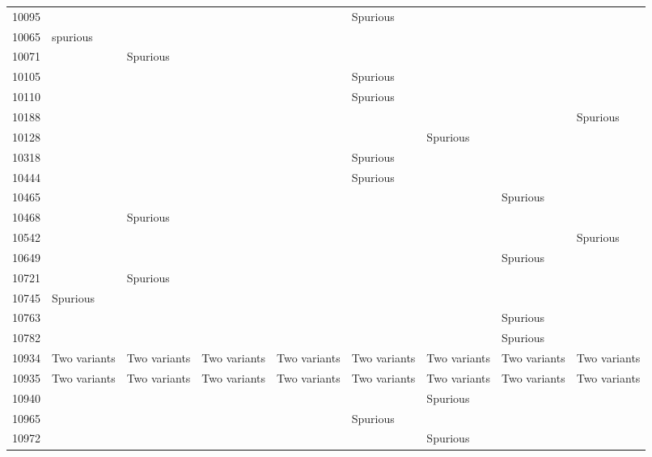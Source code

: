 \begin{table}
\begin{tabular}{lllllllll}
10095 &              &              &              &             & Spurious \\
10065 & spurious \\
10071 &              & Spurious \\
10105 &              &              &              &             & Spurious \\
10110 &              &              &              &             & Spurious \\
10188 &              &              &              &              &              &              &              & Spurious \\
10128 &              &              &              &              &              & Spurious \\
10318 &              &              &              &             & Spurious \\
10444 &              &              &              &             & Spurious \\
10465 &              &              &              &              &              &              & Spurious \\
10468 &              & Spurious \\
10542 &              &              &              &              &              &              &              & Spurious \\
10649 &              &              &              &              &              &              & Spurious \\
10721 &              & Spurious \\
10745 & Spurious \\
10763 &              &              &              &              &              &              & Spurious \\
10782 &              &              &              &              &              &              & Spurious \\
10934 & Two variants & Two variants & Two variants & Two variants & Two variants & Two variants & Two variants & Two variants \\
10935 & Two variants & Two variants & Two variants & Two variants & Two variants & Two variants & Two variants & Two variants \\
10940 &              &              &              &              &              & Spurious \\
10965 &              &              &              &             & Spurious \\
10972 &              &              &              &              &              & Spurious \\

\end{tabular}
\end{table}
